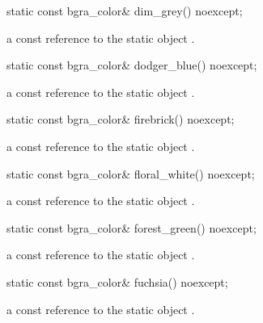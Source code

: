 \begin{itemdecl}
static const bgra_color& dim_grey() noexcept;
\end{itemdecl}
\begin{itemdescr}
\pnum
\returns
a const reference to the static  object .
\end{itemdescr}

\begin{itemdecl}
static const bgra_color& dodger_blue() noexcept;
\end{itemdecl}
\begin{itemdescr}
\pnum
\returns
a const reference to the static  object .
\end{itemdescr}

\begin{itemdecl}
static const bgra_color& firebrick() noexcept;
\end{itemdecl}
\begin{itemdescr}
\pnum
\returns
a const reference to the static  object .
\end{itemdescr}

\begin{itemdecl}
static const bgra_color& floral_white() noexcept;
\end{itemdecl}
\begin{itemdescr}
\pnum
\returns
a const reference to the static  object .
\end{itemdescr}

\begin{itemdecl}
static const bgra_color& forest_green() noexcept;
\end{itemdecl}
\begin{itemdescr}
\pnum
\returns
a const reference to the static  object .
\end{itemdescr}

\begin{itemdecl}
static const bgra_color& fuchsia() noexcept;
\end{itemdecl}
\begin{itemdescr}
\pnum
\returns
a const reference to the static  object .
\end{itemdescr}

